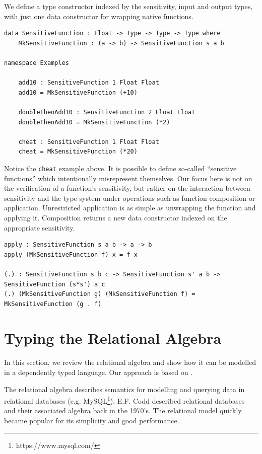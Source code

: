 \documentclass[12pt]{article}
\begin{document}
We define a type constructor indexed by the sensitivity, input and output types, with just one data constructor for wrapping native functions.

\begin{lstlisting}
data SensitiveFunction : Float -> Type -> Type -> Type where
    MkSensitiveFunction : (a -> b) -> SensitiveFunction s a b

namespace Examples

    add10 : SensitiveFunction 1 Float Float
    add10 = MkSensitiveFunction (+10)

    doubleThenAdd10 : SensitiveFunction 2 Float Float
    doubleThenAdd10 = MkSensitiveFunction (*2)

    cheat : SensitiveFunction 1 Float Float
    cheat = MkSensitiveFunction (*20)
\end{lstlisting}

Notice the \texttt{cheat} example above.
It is possible to define so-called ``sensitive functions'' which intentionally misrepresent themselves.
Our focus here is not on the verification of a function's sensitivity, but rather on the interaction between sensitivity and the type system under operations such as function composition or application.
Unrestricted application is as simple as unwrapping the function and applying it.
Composition returns a new data constructor indexed on the appropriate sensitivity.

\begin{lstlisting}
apply : SensitiveFunction s a b -> a -> b
apply (MkSensitiveFunction f) x = f x

(.) : SensitiveFunction s b c -> SensitiveFunction s' a b -> SensitiveFunction (s*s') a c
(.) (MkSensitiveFunction g) (MkSensitiveFunction f) = MkSensitiveFunction (g . f)
\end{lstlisting}

\section{Typing the Relational Algebra}\label{sec:typing_the_relational_algebra}

In this section, we review the relational algebra and show how it can be modelled in a dependently typed language.
Our approach is based on \cite{OurySwierstra08PowerOfPi}.

The relational algebra describes semantics for modelling and querying data in relational databases (e.g. MySQL\footnote{https://www.mysql.com/}).
E.F. Codd described relational databases and their associated algebra back in the 1970's.
The relational model quickly became popular for its simplicity and good performance.
\end{document}
